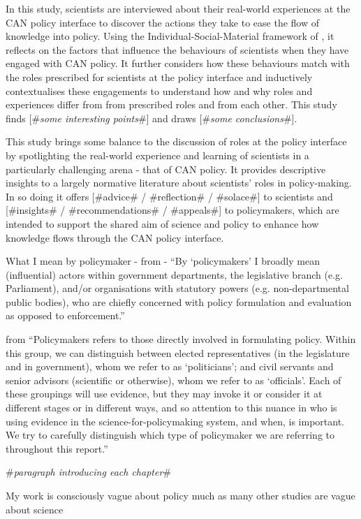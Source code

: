 In this study, scientists are interviewed about their real-world experiences at the CAN policy interface to discover the actions they take to ease the flow of knowledge into policy. Using the Individual-Social-Material framework of \textcite{DarntonH2013}, it reflects on the factors that influence the behaviours of scientists when they have engaged with CAN policy. It further considers how these behaviours match with the roles prescribed for scientists at the policy interface and inductively contextualises these engagements to understand how and why roles and experiences differ from from prescribed roles and from each other. This study finds [\#\emph{some interesting points}\#] and draws [\#\emph{some conclusions}\#]. 

This study brings some balance to the discussion of roles at the policy interface by spotlighting the real-world experience and learning of scientists in a particularly challenging arena - that of CAN policy. It provides descriptive insights to a largely normative literature about scientists' roles in policy-making. In so doing it offers [\#advice\# / \#reflection\# / \#solace\#] to scientists and [\#insights\# / \#recommendations\# / \#appeals\#] to policymakers, which are intended to support the shared aim of science and policy to enhance how knowledge flows through the CAN policy interface.

What I mean by policymaker - from \cite{Obermeister2020} - ``By `policymakers' I broadly mean (influential) actors within government departments, the legislative branch (e.g. Parliament), and/or organisations with statutory powers (e.g. non-departmental public bodies), who are chiefly concerned with policy formulation and evaluation as opposed to enforcement.''

from \cite{BA2024trust} ``Policymakers refers to those directly involved in formulating policy. Within this group,  we can distinguish between elected representatives (in the legislature and in government), whom we refer to as ‘politicians’; and civil servants and senior advisors (scientific or otherwise), whom we refer to as ‘officials’. Each of these groupings will use evidence, but they may invoke  it or consider it at different stages or in different ways, and so attention to this nuance in who  is using evidence in the science-for-policymaking system, and when, is important. We try  to carefully distinguish which type of policymaker we are referring to throughout this report.''


\#\emph{paragraph introducing each chapter}\#




My work is consciously vague about policy much as many other studies are vague about science